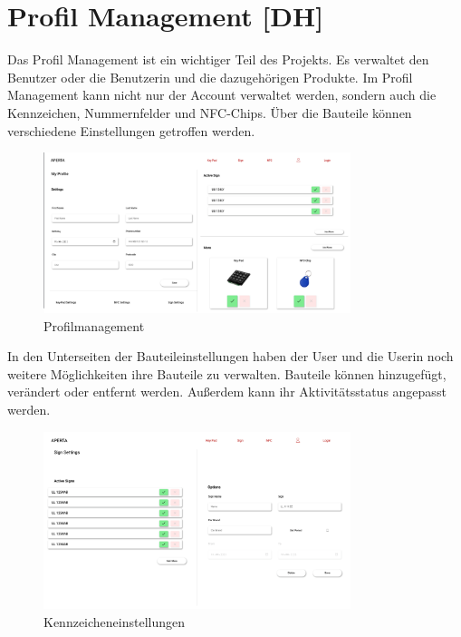 \section{Profil Management [DH]}

Das Profil Management ist ein wichtiger Teil des Projekts. Es verwaltet den Benutzer oder die Benutzerin und die dazugehörigen Produkte. Im Profil Management kann nicht nur der Account verwaltet werden, sondern auch die Kennzeichen, Nummernfelder und NFC-Chips. Über die Bauteile können verschiedene Einstellungen getroffen werden.

\begin{figure}[h]
    \centering
    \includegraphics[width=0.8\textwidth]{pics/Profil_Management.png}
    \caption{Profilmanagement}
    \end{figure}
In den Unterseiten der Bauteileinstellungen haben der User und die Userin noch weitere Möglichkeiten ihre Bauteile zu verwalten. Bauteile können hinzugefügt, verändert oder entfernt werden. Außerdem kann ihr Aktivitätsstatus angepasst werden. 

    \begin{figure}[h]
        \centering
        \includegraphics[width=0.8\textwidth]{pics/Kennzeichen_Einstellungen.png}
        \caption{Kennzeicheneinstellungen}
        \end{figure}
\pagebreak

